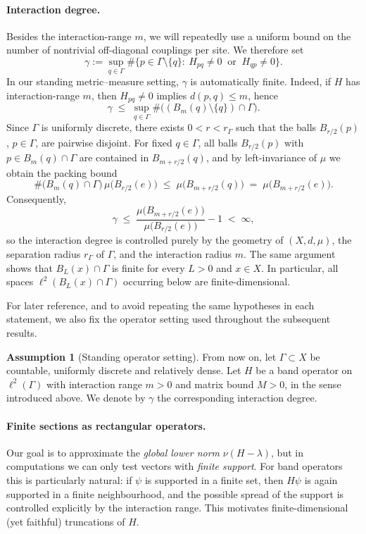 \documentclass[11pt]{article}
\theoremstyle{definition}
\newtheorem{assumption}[theorem]{Assumption}
\begin{document}
\paragraph{Interaction degree.}
Besides the interaction-range $m$, we will repeatedly use a uniform bound on the number of
nontrivial off-diagonal couplings per site.  We therefore set
\[
  \gamma
  := \sup_{q\in \Gamma}\#\bigl\{p\in \Gamma\setminus\{q\}:\ H_{pq}\neq 0 \;\; \text{or}\;\; H_{qp} \neq 0\bigr\}.
\]
In our standing metric--measure setting, $\gamma$ is automatically finite.
Indeed, if $H$ has interaction-range $m$, then $H_{pq}\neq 0$ implies
$d(p,q)\leq m$, hence
\[
  \gamma
  \;\le\;
  \sup_{q\in\Gamma}\#\bigl((B_m(q)\setminus\{q\})\cap\Gamma\bigr).
\]
Since $\Gamma$ is uniformly discrete, there exists $0<r<r_\Gamma$ such that the balls
$B_{r/2}(p)$, $p\in\Gamma$, are pairwise disjoint. For fixed $q\in\Gamma$,
all balls $B_{r/2}(p)$ with $p\in B_m(q)\cap\Gamma$ are contained in
$B_{m+r/2}(q)$, and by left-invariance of $\mu$ we obtain the packing bound
\[
  \#\bigl(B_m(q)\cap\Gamma\bigr)\,\mu\bigl(B_{r/2}(e)\bigr)
  \;\le\; \mu\bigl(B_{m+r/2}(q)\bigr)
  \;=\; \mu\bigl(B_{m+r/2}(e)\bigr).
\]
Consequently,
\[
  \gamma \;\le\; \frac{\mu\bigl(B_{m+r/2}(e)\bigr)}{\mu\bigl(B_{r/2}(e)\bigr)} - 1 \;<\;\infty,
\]
so the interaction degree is controlled purely by the geometry of
$(X,d,\mu)$, the separation radius $r_\Gamma$ of $\Gamma$, and the interaction radius $m$. The same argument shows that $B_L(x)\cap\Gamma$ is finite for every $L>0$ and $x\in X$. In particular, all spaces $\ell^2(B_L(x)\cap\Gamma)$ occurring below are finite-dimensional.

For later reference, and to avoid repeating the same hypotheses in each statement, we also fix the operator setting used throughout the
subsequent results.

\begin{assumption}[Standing operator setting]\label{ass:operators}
From now on, let $\Gamma\subset X$ be
countable, uniformly discrete and relatively dense. Let
$H$ be a band operator on $\ell^2(\Gamma)$ with interaction range
$m>0$ and matrix bound $M>0$, in the sense introduced above. We denote by
$\gamma$ the corresponding interaction degree.
\end{assumption}

\paragraph{Finite sections as rectangular operators.}
Our goal is to approximate the \emph{global lower norm} \(\nu(H-\lambda)\),
but in computations we can only test vectors with \emph{finite support}.
For band operators this is particularly natural: if \(\psi\) is supported in a
finite set, then \(H\psi\) is again supported in a finite neighbourhood, and
the possible spread of the support is controlled explicitly by the interaction
range. This motivates finite-dimensional (yet faithful) truncations of \(H\).
\end{document}
